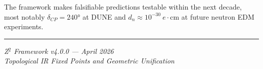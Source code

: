 \documentclass[12pt,a4paper]{article}
\begin{document}
The framework makes falsifiable predictions testable within the next decade, most notably $\delta_{CP} = 240°$ at DUNE and $d_n \approx 10^{-30}~e\cdot\text{cm}$ at future neutron EDM experiments.

\vspace{1em}
\hrule
\vspace{0.5em}
\begin{center}
\textit{Z$^2$ Framework v4.0.0 --- April 2026}\\
\textit{Topological IR Fixed Points and Geometric Unification}
\end{center}
\end{document}
